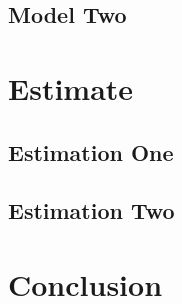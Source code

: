\documentclass[12pt,english]{article}
\begin{document}
\subsection{Model Two}


\section{Estimate}
\subsection{Estimation One}

\subsection{Estimation Two}



\section{Conclusion}



\pagebreak

\pagebreak

\appendix
\end{document}
